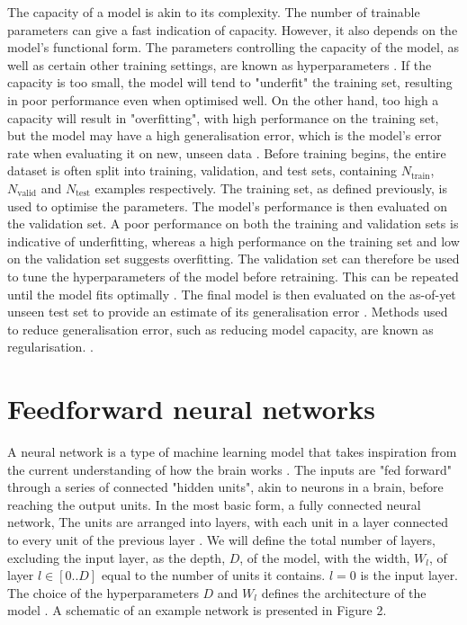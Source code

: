 \documentclass[12pt]{article}
\begin{document}
The capacity of a model is akin to its complexity. The number of trainable parameters can give a fast indication of capacity. However, it also depends on the model's functional form. The parameters controlling the capacity of the model, as well as certain other training settings, are known as hyperparameters \cite{Goodfellow16}. If the capacity is too small, the model will tend to "underfit" the training set, resulting in poor performance even when optimised well. On the other hand, too high a capacity will result in "overfitting", with high performance on the training set, but the model may have a high generalisation error, which is the model's error rate when evaluating it on new, unseen data \cite{Murphy12, Goodfellow16}. Before training begins, the entire dataset is often split into training, validation, and test sets, containing $N_{\mathrm{train}}$, $N_{\mathrm{valid}}$ and $N_{\mathrm{test}}$ examples respectively. The training set, as defined previously, is used to optimise the parameters. The model's performance is then evaluated on the validation set. A poor performance on both the training and validation sets is indicative of underfitting, whereas a high performance on the training set and low on the validation set suggests overfitting. The validation set can therefore be used to tune the hyperparameters of the model before retraining. This can be repeated until the model fits optimally \cite{Murphy12, Goodfellow16}. The final model is then evaluated on the as-of-yet unseen test set to provide an estimate of its generalisation error \cite{Murphy12}. Methods used to reduce generalisation error, such as reducing model capacity, are known as regularisation. \cite{Goodfellow16}.
\section{Feedforward neural networks}
A neural network is a type of machine learning model that takes inspiration from the current understanding of how the brain works \cite{Minsky69}. The inputs are "fed forward" through a series of connected "hidden units", akin to neurons in a brain, before reaching the output units. In the most basic form, a fully connected neural network, The units are arranged into layers, with each unit in a layer connected to every unit of the previous layer \cite{Rumelhart86}. We will define the total number of layers, excluding the input layer, as the depth, $D$, of the model, with the width, $W_l$, of layer $l\in[0..D]$ equal to the number of units it contains. $l=0$ is the input layer. The choice of the hyperparameters $D$ and $W_l$ defines the architecture of the model \cite{Haykin98}. A schematic of an example network is presented in Figure 2. 
\end{document}

